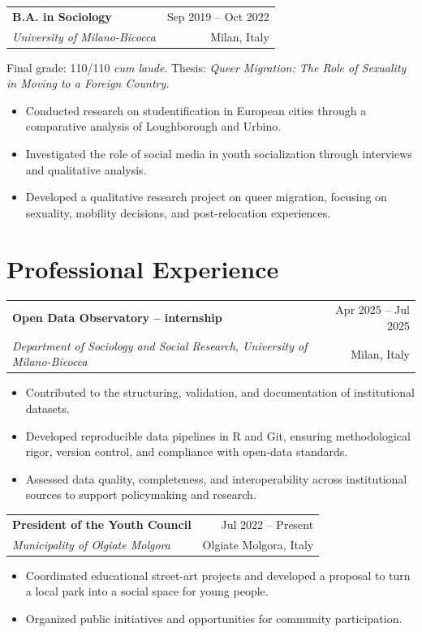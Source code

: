 \documentclass[11pt,a4paper]{article}
\makeatletter
\newcommand{\cventry}[4]{%
  \begin{tabularx}{\textwidth}{@{}Xr@{}}
    {\textbf{#1}} & {#4}\\
    {\emph{#2}} & {#3}
  \end{tabularx}\vspace{0.2em}
}
\makeatother
\begin{document}
\cventry{B.A. in Sociology}{University of Milano-Bicocca}{Milan, Italy}{Sep 2019 -- Oct 2022}
Final grade: 110/110 \emph{cum laude}. Thesis: \emph{Queer Migration: The Role of Sexuality in Moving to a Foreign Country.}
\begin{itemize}
  \item Conducted research on studentification in European cities through a comparative analysis of Loughborough and Urbino.
  \item Investigated the role of social media in youth socialization through interviews and qualitative analysis.
  \item Developed a qualitative research project on queer migration, focusing on sexuality, mobility decisions, and post-relocation experiences.
\end{itemize}

\section*{Professional Experience}

\cventry{Open Data Observatory -- internship}{Department of Sociology and Social Research, University of Milano-Bicocca}{Milan, Italy}{Apr 2025 -- Jul 2025}
\begin{itemize}
  \item Contributed to the structuring, validation, and documentation of institutional datasets.
  \item Developed reproducible data pipelines in R and Git, ensuring methodological rigor, version control, and compliance with open-data standards.
  \item Assessed data quality, completeness, and interoperability across institutional sources to support policymaking and research.
\end{itemize}

\cventry{President of the Youth Council}{Municipality of Olgiate Molgora}{Olgiate Molgora, Italy}{Jul 2022 -- Present}
\begin{itemize}
  \item Coordinated educational street-art projects and developed a proposal to turn a local park into a social space for young people.
  \item Organized public initiatives and opportunities for community participation.
\end{itemize}
\end{document}
